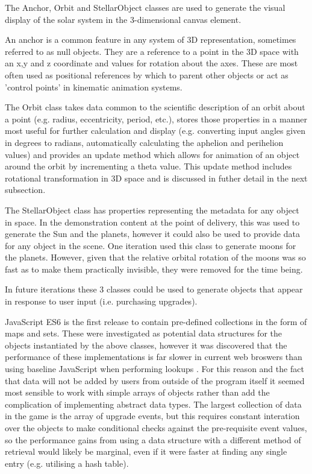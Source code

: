 \documentclass[twoside]{bhamthesis}
\begin{document}
The Anchor, Orbit and StellarObject classes are used to generate the visual display of the solar system in the 3-dimensional canvas element.

An anchor is a common feature in any system of 3D representation, sometimes referred to as null objects. They are a reference to a point in the 3D space with an x,y and z coordinate and values for rotation about the axes. These are most often used as positional references by which to parent other objects or act as 'control points' in kinematic animation systems.

The Orbit class takes data common to the scientific description of an orbit about a point (e.g. radius, eccentricity, period, etc.), stores those properties in a manner most useful for further calculation and display (e.g. converting input angles given in degrees to radians, automatically calculating the aphelion and perihelion values) and provides an update method which allows for animation of an object around the orbit by incrementing a theta value. This update method includes rotational transformation in 3D space and is discussed in futher detail in the next subsection.

The StellarObject class has properties representing the metadata for any object in space. In the demonstration content at the point of delivery, this was used to generate the Sun and the planets, however it could also be used to provide data for any object in the scene. One iteration used this class to generate moons for the planets. However, given that the relative orbital rotation of the moons was so fast as to make them practically invisible, they were removed for the time being.

In future iterations these 3 classes could be used to generate objects that appear in response to user input (i.e. purchasing upgrades).

JavaScript ES6 is the first release to contain pre-defined collections in the form of maps and sets. These were investigated as potential data structures for the objects instantiated by the above classes, however it was discovered that the performance of these implementations is far slower in current web broswers than using baseline JavaScript when performing lookups \cite{decker_six_2017}. For this reason and the fact that data will not be added by users from outside of the program itself it seemed most sensible to work with simple arrays of objects rather than add the complication of implementing abstract data types. The largest collection of data in the game is the array of upgrade events, but this requires constant interation over the objects to make conditional checks against the pre-requisite event values, so the performance gains from using a data structure with a different method of retrieval would likely be marginal, even if it were faster at finding any single entry (e.g. utilising a hash table).
\end{document}
